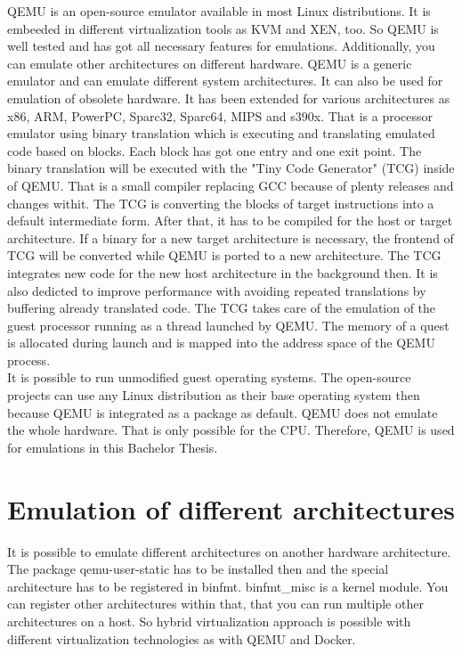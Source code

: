 QEMU is an open-source emulator available in most Linux distributions. It is embeeded in different virtualization tools as KVM and XEN, too. So QEMU is well tested and has got all necessary features for emulations. 
Additionally, you can emulate other architectures on different hardware. QEMU is a generic emulator and can emulate different system architectures. It can also be used for emulation of obsolete hardware\cite[~p.24]{Opsahl2013}. 
It has been extended for various architectures as x86, ARM, PowerPC, Sparc32, Sparc64, MIPS and s390x.
That is a processor emulator using binary translation\cite{Butt2011} which is executing and translating emulated code based on blocks. Each block has got one entry and one exit point\cite[~p.5]{Wang2010}. 
The binary translation will be executed with the "Tiny Code Generator" (TCG) inside of QEMU. 
That is a small compiler replacing GCC because of plenty releases and changes withit. The TCG is converting the blocks of target instructions into a default intermediate form. 
After that, it has to be compiled for the host or target architecture. 
If a binary for a new target architecture is necessary, the frontend of TCG will be converted while QEMU is ported to a new architecture. 
The TCG integrates new code for the new host architecture in the background then. It is also dedicted to improve performance with avoiding repeated translations by buffering already translated code\cite{Cota2017}. 
The TCG takes care of the emulation of the guest processor running as a thread launched by QEMU. The memory of a quest is allocated during launch and is mapped into the address space of the QEMU process\cite[~p.29]{Opsahl2013}.\\
It is possible to run unmodified guest operating systems. The open-source projects can use any Linux distribution as their base operating system then because QEMU is integrated as a package as default. 
QEMU does not emulate the whole hardware. That is only possible for the CPU. Therefore, QEMU is used for emulations in this Bachelor Thesis.

\section{Emulation of different architectures}

It is possible to emulate different architectures on another hardware architecture. The package qemu-user-static has to be installed then and the special architecture has to be registered in binfmt. binfmt\_misc is a kernel module. You can register other architectures within that, that you can run multiple other architectures on a host. So hybrid virtualization approach is possible with different virtualization technologies as with QEMU and Docker.


